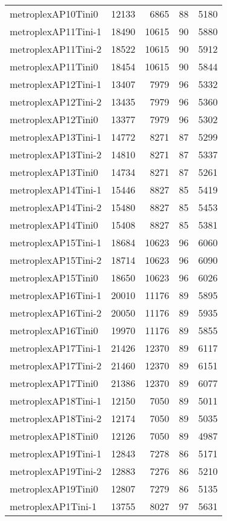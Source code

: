 \begin{longtable}{lrrrr}
metroplexAP10Tini0 & 12133 & 6865 & 88 & 5180 \\
metroplexAP11Tini-1 & 18490 & 10615 & 90 & 5880 \\
metroplexAP11Tini-2 & 18522 & 10615 & 90 & 5912 \\
metroplexAP11Tini0 & 18454 & 10615 & 90 & 5844 \\
metroplexAP12Tini-1 & 13407 & 7979 & 96 & 5332 \\
metroplexAP12Tini-2 & 13435 & 7979 & 96 & 5360 \\
metroplexAP12Tini0 & 13377 & 7979 & 96 & 5302 \\
metroplexAP13Tini-1 & 14772 & 8271 & 87 & 5299 \\
metroplexAP13Tini-2 & 14810 & 8271 & 87 & 5337 \\
metroplexAP13Tini0 & 14734 & 8271 & 87 & 5261 \\
metroplexAP14Tini-1 & 15446 & 8827 & 85 & 5419 \\
metroplexAP14Tini-2 & 15480 & 8827 & 85 & 5453 \\
metroplexAP14Tini0 & 15408 & 8827 & 85 & 5381 \\
metroplexAP15Tini-1 & 18684 & 10623 & 96 & 6060 \\
metroplexAP15Tini-2 & 18714 & 10623 & 96 & 6090 \\
metroplexAP15Tini0 & 18650 & 10623 & 96 & 6026 \\
metroplexAP16Tini-1 & 20010 & 11176 & 89 & 5895 \\
metroplexAP16Tini-2 & 20050 & 11176 & 89 & 5935 \\
metroplexAP16Tini0 & 19970 & 11176 & 89 & 5855 \\
metroplexAP17Tini-1 & 21426 & 12370 & 89 & 6117 \\
metroplexAP17Tini-2 & 21460 & 12370 & 89 & 6151 \\
metroplexAP17Tini0 & 21386 & 12370 & 89 & 6077 \\
metroplexAP18Tini-1 & 12150 & 7050 & 89 & 5011 \\
metroplexAP18Tini-2 & 12174 & 7050 & 89 & 5035 \\
metroplexAP18Tini0 & 12126 & 7050 & 89 & 4987 \\
metroplexAP19Tini-1 & 12843 & 7278 & 86 & 5171 \\
metroplexAP19Tini-2 & 12883 & 7276 & 86 & 5210 \\
metroplexAP19Tini0 & 12807 & 7279 & 86 & 5135 \\
metroplexAP1Tini-1 & 13755 & 8027 & 97 & 5631 \\

\end{longtable}
